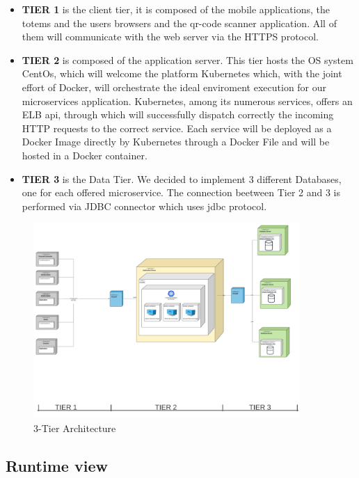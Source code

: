 \begin{itemize}[topsep=0pt]
    \item \textbf{TIER 1} is the client tier, it is composed of the mobile applications, the totems and the users browsers and the qr-code scanner application. All of them will communicate with the web server via the HTTPS protocol.
    \item \textbf{TIER 2} is composed of the application server. This tier hosts the OS system CentOs, which will welcome the platform Kubernetes which, with the joint effort of Docker, will orchestrate the ideal enviroment execution for our microservices application. Kubernetes, among its numerous services, offers an ELB api, through which will successfully dispatch correctly the incoming HTTP requests to the correct service. Each service will be deployed as a Docker Image directly by Kubernetes through a Docker File and will be hosted in a Docker container.
    \item \textbf{TIER 3} is the Data Tier. 
    We decided to implement 3 different Databases, one for each offered microservice. 
    The connection beetween Tier 2 and 3 is performed via JDBC connector which uses jdbc protocol.
\end{itemize}

\begin{figure}[h!]
    \centering
    \includegraphics[width=0.9\textwidth]{Images/Deployementview(2).png}
    \caption{\label{fig:Deployement View}{3-Tier Architecture}}
\end{figure}

\FloatBarrier

\subsection{Runtime view}
\label{subsect:runtimeview}


